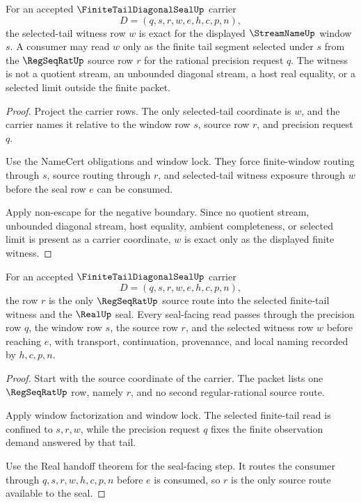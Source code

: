 \begin{theorem}
\label{thm:finite-tail-diagonal-seal-selected-tail-exactness}
For an accepted $\FiniteTailDiagonalSealUp$ carrier
$$
D=(q,s,r,w,e,h,c,p,n),
$$
the selected-tail witness row $w$ is exact for the displayed $\StreamNameUp$ window $s$. A consumer may read $w$ only as the finite tail segment selected under $s$ from the $\RegSeqRatUp$ source row $r$ for the rational precision request $q$. The witness is not a quotient stream, an unbounded diagonal stream, a host real equality, or a selected limit outside the finite packet.
\end{theorem}
\begin{proof}
Project the carrier rows. The only selected-tail coordinate is $w$, and the carrier names it relative to the window row $s$, source row $r$, and precision request $q$.

Use the NameCert obligations and window lock. They force finite-window routing through $s$, source routing through $r$, and selected-tail witness exposure through $w$ before the seal row $e$ can be consumed.

Apply non-escape for the negative boundary. Since no quotient stream, unbounded diagonal stream, host equality, ambient completeness, or selected limit is present as a carrier coordinate, $w$ is exact only as the displayed finite witness.
\end{proof}

\begin{theorem}
\label{thm:finite-tail-diagonal-seal-regseq-source-coverage}
For an accepted $\FiniteTailDiagonalSealUp$ carrier
$$
D=(q,s,r,w,e,h,c,p,n),
$$
the row $r$ is the only $\RegSeqRatUp$ source route into the selected finite-tail witness and the $\RealUp$ seal. Every seal-facing read passes through the precision row $q$, the window row $s$, the source row $r$, and the selected witness row $w$ before reaching $e$, with transport, continuation, provenance, and local naming recorded by $h,c,p,n$.
\end{theorem}
\begin{proof}
Start with the source coordinate of the carrier. The packet lists one $\RegSeqRatUp$ row, namely $r$, and no second regular-rational source route.

Apply window factorization and window lock. The selected finite-tail read is confined to $s,r,w$, while the precision request $q$ fixes the finite observation demand answered by that tail.

Use the Real handoff theorem for the seal-facing step. It routes the consumer through $q,s,r,w,h,c,p,n$ before $e$ is consumed, so $r$ is the only source route available to the seal.
\end{proof}

